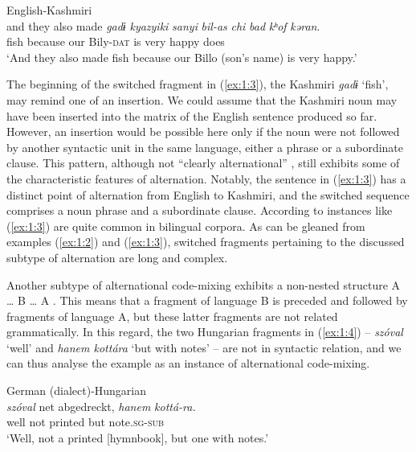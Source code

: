 \ea
\label{ex:1:3}
English-Kashmiri \citep[228]{bhatt-1997}\\
\gll {\dots} and they also made \textit{gadɨ} \textit{kyazyiki} \textit{sanyi} \textit{bil-as} \textit{chi} \textit{bad} \textit{kʰof} \textit{kəran}.\\
	{} {} {} {} {} fish because our Bily-\textsc{dat} is very happy does\\
\glt `And they also made fish because our Billo (son's name) is very happy.' 
\z

\noindent The beginning of the switched fragment in (\ref{ex:1:3}), the Kashmiri \textit{gadɨ} `fish', may remind one of an insertion. We could assume that the Kashmiri noun may have been inserted into the matrix of the English sentence produced so far. However, an insertion would be possible here only if the noun were not followed by another syntactic unit in the same language, either a phrase or a subordinate clause. This pattern, although not ``clearly alternational'' \citep[102]{muysken-bilingual-2000}, still exhibits some of the characteristic features of alternation. Notably, the sentence in (\ref{ex:1:3}) has a distinct point of alternation from English to Kashmiri, and the switched sequence comprises a noun phrase and a subordinate clause. According to \citet[303]{auer2014} instances like (\ref{ex:1:3}) are quite common in bilingual corpora. As can be gleaned from examples (\ref{ex:1:2}) and (\ref{ex:1:3}), switched fragments pertaining to the discussed subtype of alternation are long and complex.

Another subtype of alternational code-mixing exhibits a non-nested structure A {\dots} B {\dots} A \citep[cf.][97--103]{muysken-bilingual-2000}. This means that a fragment of language B is preceded and followed by fragments of language A, but these latter fragments are not related grammatically. In this regard, the two Hungarian fragments in (\ref{ex:1:4}) -- \textit{szóval} `well' and \textit{hanem kottára} `but with notes' -- are not in syntactic relation, and we can thus analyse the example as an instance of alternational code-mixing.

\ea{\label{ex:1:4}}
German (dialect)-Hungarian \citep[260]{szabo-language-2010}\\
\gll \textit{szóval} net abgedreckt, \textit{hanem} \textit{kottá-ra.}\\
	well not printed but note.\textsc{sg-sub}\\
\glt `Well, not a printed [hymnbook], but one with notes.' 
\z 

